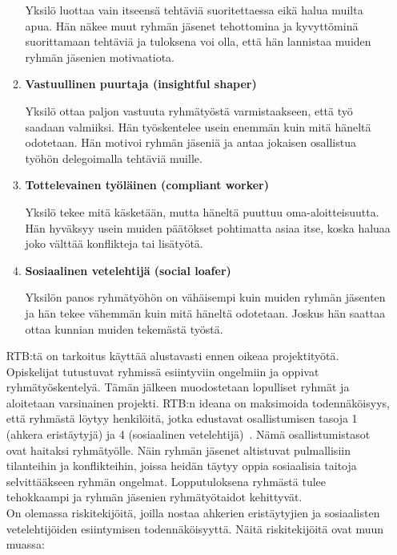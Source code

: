 \documentclass[finnish]{../tktltiki2}
\theoremstyle{definition}
\theoremstyle{remark}
\begin{document}
\begin{itemize}
\begin{enumerate}
Yksilö luottaa vain itseensä tehtäviä suoritettaessa eikä halua muilta apua. Hän näkee
muut ryhmän jäsenet tehottomina ja kyvyttöminä suorittamaan tehtäviä ja tuloksena voi olla, että
hän lannistaa muiden ryhmän jäsenien motivaatiota.

\item {\bf Vastuullinen puurtaja (insightful shaper)}

Yksilö ottaa paljon vastuuta ryhmätyöstä varmistaakseen, että
työ saadaan valmiiksi. Hän työskentelee usein enemmän kuin mitä
häneltä odotetaan. Hän motivoi ryhmän jäseniä ja antaa jokaisen
osallistua työhön delegoimalla tehtäviä muille.

\item {\bf Tottelevainen työläinen (compliant worker)}

Yksilö tekee mitä käsketään, mutta häneltä puuttuu oma-aloittei\-suutta. Hän hyväksyy usein muiden päätökset pohtimatta
asiaa itse, koska haluaa joko välttää konflikteja tai lisätyötä.

\item {\bf Sosiaalinen vetelehtijä (social loafer)}

Yksilön panos ryhmätyöhön on vähäisempi kuin muiden ryhmän jäsenten ja hän
tekee vähemmän kuin mitä häneltä odotetaan. Joskus hän saattaa ottaa kunnian muiden
tekemästä työstä.

\end{enumerate}

RTB:tä on tarkoitus käyttää alustavasti ennen oikeaa projektityötä. Opiskelijat tutustuvat ryhmissä esiintyviin ongelmiin ja oppivat ryhmä\-työskentelyä. Tämän jälkeen muodostetaan lopulliset ryhmät ja aloitetaan varsinainen projekti.
RTB:n ideana on maksimoida todennäköisyys, että ryhmästä löytyy henkilöitä, jotka edustavat osallistumisen tasoja 1 (ahkera eristäytyjä) ja 4 (sosiaalinen vetelehtijä)~\cite{Pieterse:2012:PPS:2157136.2157218}. Nämä osallistumistasot ovat haitaksi ryhmätyölle. Näin ryhmän jäsenet altistuvat pulmallisiin tilanteihin ja konflikteihin, joissa heidän täytyy oppia sosiaalisia taitoja selvittääkseen ryhmän ongelmat. Lopputuloksena ryhmästä tulee tehokkaampi ja ryhmän jäsenien ryhmätyötaidot kehittyvät.\\

On olemassa riskitekijöitä, joilla nostaa ahkerien eristäytyjien ja sosiaalisten vetelehtijöiden esiintymisen todennäköisyyttä. Näitä riskitekijöitä ovat muun muassa:

\begin{enumerate}


\end{enumerate}
\end{itemize}
\end{document}
